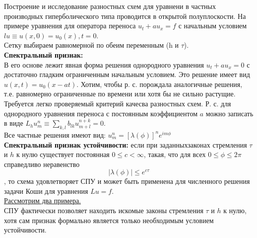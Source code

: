 \documentclass[specialist, subf, href, colorlinks=true, 12pt, times, mtpro, final]{disser}
\theoremstyle{definition}
\begin{document}
{    Построение и исследование разностных схем для уравнени в частных производных гиперболического типа проводится в открытой полуплоскости. На примере уравнения для оператора переноса $u_t +au_x = f$ с начальным условием $lu \equiv u(x,0) =u_0(x), t = 0$.\\
    Сетку выбираем равномерной по обеим переменным (h и $\tau$).\\
    \textbf{Спектральный признак:}\\
    В его основе лежит явная форма решения однородного уравнения $u_t + au_x = 0$ с достаточно гладким ограниченным начальным условием. Это решение имеет вид $u(x,t) = u_0(x-at).$ Хотим, чтобы р. с. порождала аналогичные решения, т.е. равномерно ограниченные по времени или хотя бы не сильно растущие. Требуется легко проверяемый критерий качесва разностных схем.
    Р. с. для однородного уравнения переноса с постоянным коэффициентом $a$ можно записать в виде $L_hu_m^n \equiv \sum\limits_{k,l} b_{lk} u^{n+k}_{m+l}=0.$\\
    Все частные решения имеют вид: $u_m^n = [\lambda(\phi)]^n e^{im\phi}$\\
    \textbf{Спектральный признак устойчивости:} если при заданныхзаконах стремления $\tau$ и $h$ к нулю существует постоянная $0 \leqslant c < \infty$, такая, что для всех $0 \leqslant \phi \leqslant 2\pi$ справедливо неравенство $$|\lambda(\phi)| \leqslant e^{c\tau}$$, 
    то схема удовлетворяет СПУ и может быть применена для численного решения задачи Коши для уравнения $Lu = f$.\\
    \hyperlink {lects.131}{Рассмотрим два примера.}\\
    СПУ фактически позволяет находить искомые законы стремления $\tau$ и $h$ к нулю, хотя сам признак формально является только необходимым условием устойчивости.

}
\end{document}
